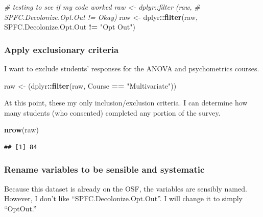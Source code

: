 \documentclass[
  11pt,
]{book}
\newenvironment{Shaded}{\begin{snugshade}}{\end{snugshade}}
\newcommand{\CommentTok}[1]{\textcolor[rgb]{0.37,0.37,0.37}{\textit{#1}}}
\newcommand{\FunctionTok}[1]{\textcolor[rgb]{0.27,0.27,0.27}{\textbf{#1}}}
\newcommand{\NormalTok}[1]{#1}
\newcommand{\OtherTok}[1]{\textcolor[rgb]{0.37,0.37,0.37}{#1}}
\newcommand{\SpecialCharTok}[1]{\textcolor[rgb]{0.43,0.43,0.43}{\textbf{#1}}}
\newcommand{\StringTok}[1]{\textcolor[rgb]{0.5,0.5,0.5}{#1}}
\begin{document}
\begin{Shaded}
\begin{Highlighting}[]
\CommentTok{\# testing to see if my code worked raw \textless{}{-} dplyr::filter (raw,}
\CommentTok{\# SPFC.Decolonize.Opt.Out != \textquotesingle{}Okay\textquotesingle{})}
\NormalTok{raw }\OtherTok{\textless{}{-}}\NormalTok{ dplyr}\SpecialCharTok{::}\FunctionTok{filter}\NormalTok{(raw, SPFC.Decolonize.Opt.Out }\SpecialCharTok{!=} \StringTok{"Opt Out"}\NormalTok{)}
\end{Highlighting}
\end{Shaded}

\hypertarget{apply-exclusionary-criteria}{%
\subsubsection*{Apply exclusionary criteria}\label{apply-exclusionary-criteria}}


I want to exclude students' responses for the ANOVA and psychometrics courses.

\begin{Shaded}
\begin{Highlighting}[]
\NormalTok{raw }\OtherTok{\textless{}{-}}\NormalTok{ (dplyr}\SpecialCharTok{::}\FunctionTok{filter}\NormalTok{(raw, Course }\SpecialCharTok{==} \StringTok{"Multivariate"}\NormalTok{))}
\end{Highlighting}
\end{Shaded}

At this point, these my only inclusion/exclusion criteria. I can determine how many students (who consented) completed any portion of the survey.

\begin{Shaded}
\begin{Highlighting}[]
\FunctionTok{nrow}\NormalTok{(raw)}
\end{Highlighting}
\end{Shaded}

\begin{verbatim}
## [1] 84
\end{verbatim}

\hypertarget{rename-variables-to-be-sensible-and-systematic}{%
\subsubsection*{Rename variables to be sensible and systematic}\label{rename-variables-to-be-sensible-and-systematic}}


Because this dataset is already on the OSF, the variables are sensibly named. However, I don't like ``SPFC.Decolonize.Opt.Out''. I will change it to simply ``OptOut.''
\end{document}
